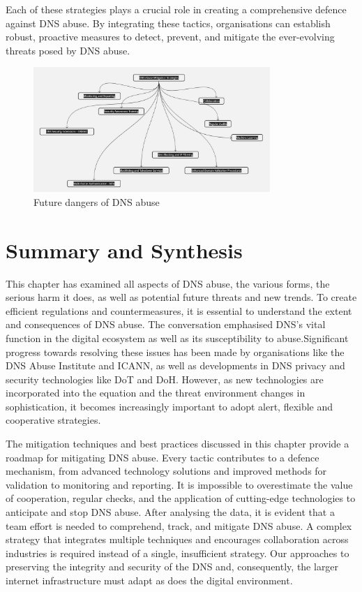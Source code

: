 Each of these strategies plays a crucial role in creating a comprehensive defence against DNS abuse. By integrating these tactics, organisations can establish robust, proactive measures to detect, prevent, and mitigate the ever-evolving threats posed by DNS abuse.
\captionsetup{font= small}
\begin{figure}[ht!]
\centering
\includegraphics[width=0.8\textwidth]{background/DNSabuseMiti.jpg}
\caption{Future dangers of DNS abuse}
\label{fig:figureSix}
\end{figure}

\section{Summary and Synthesis}

This chapter has examined all aspects of DNS abuse,  the various forms, the serious harm it does, as well as potential future threats and new trends. To create efficient regulations and countermeasures, it is essential to understand the extent and consequences of DNS abuse. The conversation emphasised DNS's vital function in the digital ecosystem as well as its susceptibility to abuse.Significant progress towards resolving these issues has been made by organisations like the DNS Abuse Institute and ICANN, as well as developments in DNS privacy and security technologies like DoT and DoH. However, as new technologies are incorporated into the equation and the threat environment changes in sophistication, it becomes increasingly important to adopt alert, flexible and cooperative strategies.  

The mitigation techniques and best practices discussed in this chapter provide a roadmap for mitigating DNS abuse. Every tactic contributes to a defence mechanism, from advanced technology solutions and improved methods for validation to monitoring and reporting. It is impossible to overestimate the value of cooperation, regular checks, and the application of cutting-edge technologies to anticipate and stop DNS abuse. After analysing the data, it is evident that a team effort is needed to comprehend, track, and mitigate DNS abuse. A complex strategy that integrates multiple techniques and encourages collaboration across industries is required instead of a single, insufficient strategy. Our approaches to preserving the integrity and security of the DNS and, consequently, the larger internet infrastructure must adapt as does the digital environment.

